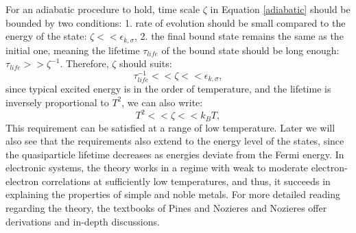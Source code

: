 For an adiabatic procedure to hold, time scale $\zeta$ in Equation \ref{adiabatic} should be bounded by two conditions: 1. rate of evolution should be small compared to the energy of the state: $\zeta << \epsilon_{k,\sigma}$, 2. the final bound state remains the same as the initial one, meaning the lifetime $\tau_{life}$ of the bound state should be long enough: $\tau_{life} >> \zeta^{-1}$. Therefore, $\zeta$ should suits: 
\begin{equation}
	\tau_{life}^{-1} << \zeta << \epsilon_{k,\sigma},
\end{equation}
since typical excited energy is in the order of temperature, and the lifetime is inversely proportional to $T^2$, we can also write:
\begin{equation}
	T^2 << \zeta << k_B T,
\end{equation}
This requirement can be satisfied at a range of low temperature. Later we will also see that the requirements also extend to the energy level of the states, since the quasiparticle lifetime decreases as energies deviate from the Fermi energy. 
In electronic systems, the theory works in a regime with weak to moderate electron-electron correlations at sufficiently low temperatures, and thus, it succeeds in explaining the properties of simple and noble metals. For more detailed reading regarding the theory, the textbooks of Pines and Nozieres\cite{nozieresTheoryQuantumLiquids2018a} and Nozieres \cite{nozieresDerivationLandauTheory1962} offer derivations and in-depth discussions. 

